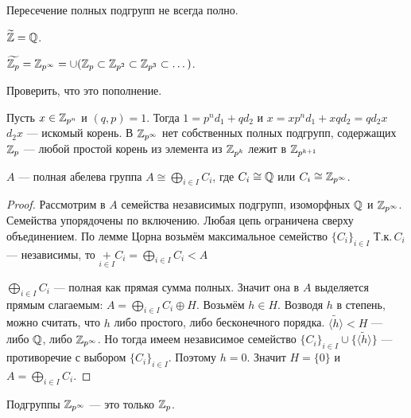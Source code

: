 \documentclass[10pt,a4paper,draft]{article}
\begin{document}
\begin{note}
Пересечение полных подгрупп не всегда полно.
\end{note}

\begin{ex}
$\widetilde{\mathbb Z}=\mathbb Q$.
\end{ex}

\begin{ex}
$\widetilde{\mathbb Z_p}=\mathbb Z_{p^\infty}=\cup(\mathbb Z_p\subset\mathbb Z_{p^2}\subset\mathbb Z_{p^3}\subset
\dots)$.
\end{ex}

\begin{problem} Проверить, что это
пополнение.
\end{problem}

\inst Пусть $x\in\mathbb Z_{p^n}$ и $(q,p)=1$.
Тогда $1=p^nd_1+qd_2$ и $x=xp^nd_1+xqd_2=qd_2x$ $d_2x$ --- искомый
корень. В $\mathbb Z_{p^\infty}$ нет собственных полных подгрупп,
содержащих $\mathbb Z_p$
--- любой простой корень из элемента из $\mathbb Z_{p^k}$ лежит в
$\mathbb Z_{p^{k+1}}$

\begin{theorem}
{$A$ --- полная абелева группа \ifif $A\cong
\bigoplus\limits_{i\in I}C_i$, где $C_i\cong\mathbb Q$ или
$C_i\cong\mathbb Z_{p^\infty}$.}\label{completeness_criterion}
\end{theorem}

\begin{proof} Рассмотрим в $A$ семейства независимых подгрупп, изоморфных
$\mathbb Q$ и $\mathbb Z_{p^\infty}$. Семейства упорядочены по включению.
Любая цепь ограничена сверху объединением. По лемме Цорна возьмём
максимальное семейство $\{C_i\}_{i\in I}$ Т.к.\,$C_i$ ---
независимы, то $\mathop+\limits_{i\in I}C_i=\bigoplus\limits_{i\in
I}C_i<A$

$\bigoplus\limits_{i\in I}C_i$ --- полная как прямая сумма полных.
Значит она в $A$ выделяется прямым слагаемым:
$A=\bigoplus\limits_{i\in I}C_i\oplus H$. Возьмём $h\in H$.
Возводя $h$ в степень, можно считать, что $h$ либо простого, либо
бесконечного порядка. $\widetilde{\langle h\rangle}<H$ --- либо
$\mathbb Q$, либо $\mathbb Z_{p^\infty}$. Но тогда имеем независимое семейство
$\{C_i\}_{i\in I}\cup\{\widetilde{\langle h\rangle}\}$ ---
противоречие с выбором $\{C_i\}_{i\in I}$. Поэтому $h=0$. Значит
$H=\{0\}$ и $A=\bigoplus\limits_{i\in I}C_i$.\end{proof}

\begin{problem} Подгруппы $\mathbb Z_{p^\infty}$ --- это только
$\mathbb Z_p$.
\end{problem}
\end{document}
